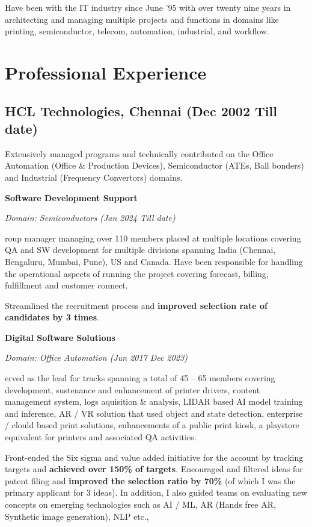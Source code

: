 \documentclass[a4paper,12pt]{article}
\newcommand\cvsubsection[3]{\subsection*{#1 \quad \small{(#2 \textendash #3)}}}
\newcommand\cvprojectentry[5]{
  \textbf{#1}
  
  \it{Domain: #2}\normalfont{} \quad (#3 \textendash #4)
  
}
\begin{document}
{
Have been with the IT industry since June '95 with over twenty nine years
in architecting and managing multiple projects and functions in
domains like printing, semiconductor, telecom, automation, industrial,
and workflow.

\section*{Professional Experience}
  
\cvsubsection{HCL Technologies, Chennai}{Dec 2002}{Till date}

Extensively managed programs and technically contributed on the Office
Automation (Office \& Production Devices), Semiconductor (ATEs, Ball
bonders) and Industrial (Frequency Convertors) domains.

\cvprojectentry{Software Development Support}{Semiconductors}{Jan 2024}{Till date}

Group manager managing over 110 members placed at multiple locations
covering QA and SW development for multiple divisions spanning India
(Chennai, Bengaluru, Mumbai, Pune), US and Canada. Have been responsible for
handling the operational aspects of running the project covering
forecast, billing, fulfillment and customer connect.

Streamlined the recruitment process and \textbf{improved selection rate of
candidates by 3 times}.

\cvprojectentry{Digital Software Solutions}{Office Automation}{Jun 2017}{Dec 2023}

Served as the lead for tracks spanning a total of 45 – 65 members
covering development, sustenance and enhancement of printer drivers,
content management system, logs aquisition \& analysis, LIDAR based AI
model training and inference, AR / VR solution that used object and
state detection, enterprise / clould based print solutions,
enhancements of a public print kiosk, a playstore equivalent for
printers and associated QA activities.

Front-ended the Six sigma and value added initiative for the account
by tracking targets and \textbf{achieved over 150\% of
  targets}. Encouraged and filtered ideas for patent filing and
\textbf{improved the selection ratio by 70\%} (of which I was the
primary applicant for 3 ideas). In addition, I also guided teams on
evaluating new concepts on emerging technologies such as AI / ML, AR
(Hands free AR, Synthetic image generation), NLP etc.,


}
\end{document}
